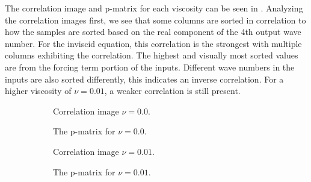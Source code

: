 \documentclass[preprint,12pt,times,authoryear]{elsarticle}
\begin{document}
The correlation image and p-matrix for each viscosity can be seen in . Analyzing the correlation images first, we see that some columns are sorted in correlation to how the samples are sorted based on the real component of the 4th output wave number. For the inviscid equation, this correlation is the strongest with multiple columns exhibiting the correlation. The highest and visually most sorted values are from the forcing term portion of the inputs. Different wave numbers in the inputs are also sorted differently, this indicates an inverse correlation. For a higher viscosity of \(\nu=0.01\), a weaker correlation is still present.
\begin{figure}[H]
  \centering
  \begin{subfigure}{0.49\linewidth}
    \begin{adjustbox}{width=\linewidth}
      
    \end{adjustbox}
    \caption{Correlation image \(\nu=0.0\).}\label{fig:sc2_ci_0.0}
  \end{subfigure}
  \begin{subfigure}{0.49\linewidth}
    \begin{adjustbox}{width=\linewidth}
      
    \end{adjustbox}
    \caption{The p-matrix for \(\nu=0.0\).}\label{fig:sc2_pm_0.0}
  \end{subfigure}
  \begin{subfigure}{0.49\linewidth}
    \begin{adjustbox}{width=\linewidth}
      
    \end{adjustbox}
    \caption{Correlation image \(\nu=0.01\).}\label{fig:sc2_ci_0.01}
  \end{subfigure}
  \begin{subfigure}{0.49\linewidth}
    \begin{adjustbox}{width=\linewidth}
      
    \end{adjustbox}
    \caption{The p-matrix for \(\nu=0.01\).}\label{fig:sc2_pm_0.01}
  \end{subfigure}
  \begin{subfigure}{0.49\linewidth}
    \begin{adjustbox}{width=\linewidth}
      

\end{adjustbox}
\end{subfigure}
\end{figure}
\end{document}
